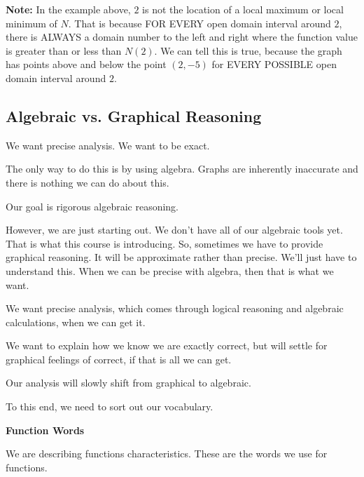 \documentclass{ximera}
\begin{document}
\textbf{Note:} In the example above, $2$ is not the location of a local maximum or local minimum of $N$.  That is because FOR EVERY open domain interval around $2$, there is ALWAYS a domain number to the left and right where the function value is greater than or less than $N(2)$.  We can tell this is true, because the graph has points above and below the point $(2, -5)$ for EVERY POSSIBLE open domain interval around $2$. 










\subsection*{Algebraic vs. Graphical Reasoning}





We want precise analysis.  We want to be exact. 


The only way to do this is by using algebra.  Graphs are inherently inaccurate and there is nothing we can do about this. 


Our goal is rigorous algebraic reasoning. 



However, we are just starting out.  We don't have all of our algebraic tools yet.  That is what this course is introducing.  So, sometimes we have to provide graphical reasoning.  It will be approximate rather than precise.  We'll just have to understand this.  When we can be precise with algebra, then that is what we want. 


We want precise analysis, which comes through logical reasoning and algebraic calculations, when we can get it. 


We want to explain how we know we are exactly correct, but will settle for graphical feelings of correct, if that is all we can get. 

Our analysis will slowly shift from graphical to algebraic.


To this end, we need to sort out our vocabulary.


\textbf{\textcolor{red!75!green}{Function Words}}

We are describing functions characteristics. These are the words we use for functions.
\end{document}

